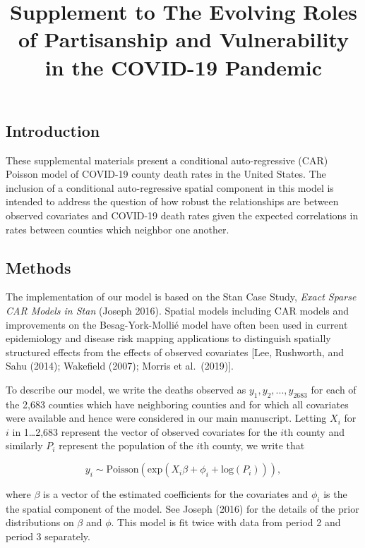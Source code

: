 \documentclass[
]{article}
\title{Supplement to The Evolving Roles of Partisanship and
Vulnerability in the COVID-19 Pandemic}
\author{}
\date{\vspace{-2.5em}}
\begin{document}
\maketitle

\hypertarget{introduction}{%
\subsection{Introduction}\label{introduction}}

These supplemental materials present a conditional auto-regressive (CAR)
Poisson model of COVID-19 county death rates in the United States. The
inclusion of a conditional auto-regressive spatial component in this
model is intended to address the question of how robust the
relationships are between observed covariates and COVID-19 death rates
given the expected correlations in rates between counties which neighbor
one another.

\hypertarget{methods}{%
\subsection{Methods}\label{methods}}

The implementation of our model is based on the Stan Case Study,
\emph{Exact Sparse CAR Models in Stan} (Joseph 2016). Spatial models
including CAR models and improvements on the Besag-York-Mollié model
have often been used in current epidemiology and disease risk mapping
applications to distinguish spatially structured effects from the
effects of observed covariates {[}Lee, Rushworth, and Sahu (2014);
Wakefield (2007); Morris et al.~(2019){]}.

To describe our model, we write the deaths observed as
\(y_1, y_2, ..., y_{2683}\) for each of the 2,683 counties which have
neighboring counties and for which all covariates were available and
hence were considered in our main manuscript. Letting \(X_i\) for \(i\)
in 1\ldots2,683 represent the vector of observed covariates for the
\(i\)th county and similarly \(P_i\) represent the population of the
\(i\)th county, we write that

\[y_i \sim \text{Poisson}(\text{exp}(X_i \beta + \phi_i + \text{log}(P_i))),\]

where \(\beta\) is a vector of the estimated coefficients for the
covariates and \(\phi_i\) is the the spatial component of the model. See
Joseph (2016) for the details of the prior distributions on \(\beta\)
and \(\phi\). This model is fit twice with data from period 2 and period
3 separately.
\end{document}

